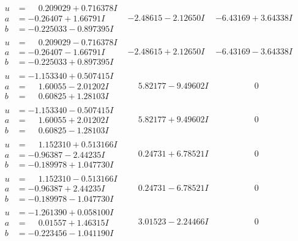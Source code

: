\documentclass[1p]{elsarticle_modified}
\theoremstyle{definition}
\begin{document}
$$\begin{array}{c|c|c}
\begin{aligned}
u &= \phantom{-}0.209029 + 0.716378 I \\
a &= -0.26407 + 1.66791 I \\
b &= -0.225033 - 0.897395 I\end{aligned}
 & -2.48615 - 2.12650 I & -6.43169 + 3.64338 I \\ \hline\begin{aligned}
u &= \phantom{-}0.209029 - 0.716378 I \\
a &= -0.26407 - 1.66791 I \\
b &= -0.225033 + 0.897395 I\end{aligned}
 & -2.48615 + 2.12650 I & -6.43169 - 3.64338 I \\ \hline\begin{aligned}
u &= -1.153340 + 0.507415 I \\
a &= \phantom{-}1.60055 - 2.01202 I \\
b &= \phantom{-}0.60825 + 1.28103 I\end{aligned}
 & \phantom{-}5.82177 - 9.49602 I & \phantom{-0.000000 } 0 \\ \hline\begin{aligned}
u &= -1.153340 - 0.507415 I \\
a &= \phantom{-}1.60055 + 2.01202 I \\
b &= \phantom{-}0.60825 - 1.28103 I\end{aligned}
 & \phantom{-}5.82177 + 9.49602 I & \phantom{-0.000000 } 0 \\ \hline\begin{aligned}
u &= \phantom{-}1.152310 + 0.513166 I \\
a &= -0.96387 - 2.44235 I \\
b &= -0.189978 + 1.047730 I\end{aligned}
 & \phantom{-}0.24731 + 6.78521 I & \phantom{-0.000000 } 0 \\ \hline\begin{aligned}
u &= \phantom{-}1.152310 - 0.513166 I \\
a &= -0.96387 + 2.44235 I \\
b &= -0.189978 - 1.047730 I\end{aligned}
 & \phantom{-}0.24731 - 6.78521 I & \phantom{-0.000000 } 0 \\ \hline\begin{aligned}
u &= -1.261390 + 0.058100 I \\
a &= \phantom{-}0.01557 + 1.46315 I \\
b &= -0.223456 - 1.041190 I\end{aligned}
 & \phantom{-}3.01523 - 2.24466 I & \phantom{-0.000000 } 0\\

\end{array}$$
\end{document}
